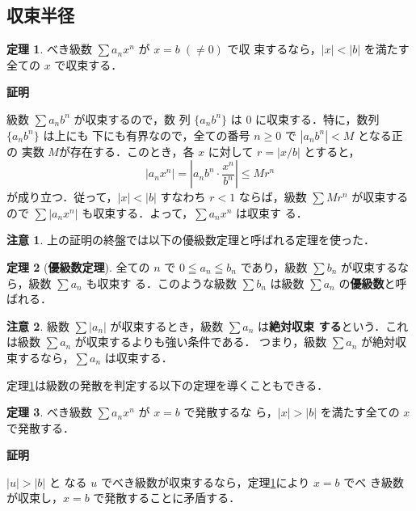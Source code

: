 \documentclass[10pt, uplatex, dvipdfmx]{jsarticle}
\makeatletter
\renewenvironment{proof}[1][\proofname]{\par
  \pushQED{\qed}%
  \normalfont \topsep6\p@\@plus6\p@\relax
  \trivlist
  \item\relax
  {\bfseries
  #1\@addpunct{.}}\hspace\labelsep\ignorespaces
}{%
  \popQED\endtrivlist\@endpefalse
}
\theoremstyle{definition}
\newtheorem{theorem}{定理}[section]
\newtheorem*{remark}{注意}
\renewcommand{\proofname}{\textbf{証明}}
\numberwithin{equation}{section}
\newcommand{\ds}{\displaystyle}
\makeatother
\begin{document}
\subsection{収束半径}

\begin{theorem}\label{thm:conv-seriese}
  べき級数 $\sum a_n x^n$ が $x=b \; (\neq 0)$ で収
  束するなら，$|x| < |b|$ を満たす全ての $x$ で収束する．
\end{theorem}

\begin{proof}
  級数 $\sum a_n b^n$ が収束するので，数
  列 $\{a_nb^n\}$ は $0$ に収束する．特に，数列 $\{a_n b^n\}$ は上にも
  下にも有界なので，全ての番号 $n \geq 0$ で $|a_n b^n| <M$ となる正の
  実数 $M$が存在する．このとき，各 $x$ に対して $\ds
  r=\left|x/b\right|$ とすると，
  \[
    |a_n x^n| = \left| a_n b^n \cdot \frac{x^n}{b^n}\right| \leq M r^n
  \]
  が成り立つ．従って，$|x| < |b|$ すなわち $r<1$ ならば，級数
  $\sum Mr^n$ が収束するので
  $\sum |a_n x^n|$
  も収束する．よって，$\sum  a_n x^n$ は収束す
  る．
\end{proof}

\begin{remark}
上の証明の終盤では以下の優級数定理と呼ばれる定理を使った．
\end{remark}

\begin{theorem}[\textbf{優級数定理}] 全ての $n$ で $0 \leqq a_n \leqq
  b_n$ であり，級数 $\sum b_n$ が収束するなら，級数 $\sum a_n$ も収束す
  る．このような級数 $\sum b_n$ は級数 $\sum a_n$ の\textbf{優級数}と呼ばれる．
\end{theorem}

\begin{remark}
  級数 $\sum |a_n|$ が収束するとき，級数 $\sum a_n$ は\textbf{絶対収束
    する}という．これは級数 $\sum a_n$ が収束するよりも強い条件である．
  つまり，級数 $\sum a_n$ が絶対収束するなら，$\sum a_n$ は収束する．
\end{remark}

定理\ref{thm:conv-seriese}は級数の発散を判定する以下の定理を導くこともできる．

\begin{theorem}\label{thm:div-seriese}
べき級数 $\sum a_n x^n$ が $x=b$ で発散するな
ら，$|x| > |b|$ を満たす全ての $x$ で発散する．
\end{theorem}

\begin{proof}
$|u|> |b|$ と
なる $u$ でべき級数が収束するなら，定理\ref{thm:conv-seriese}により $x=b$ でべ
き級数が収束し，$x=b$ で発散することに矛盾する．
\end{proof}
\end{document}
